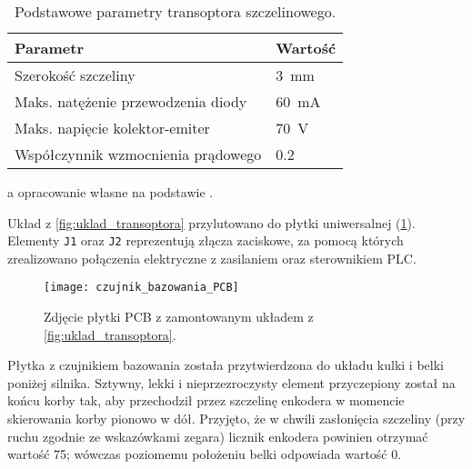 \begin{table}[h]
    \centering
    \begin{threeparttable}
        \caption{Podstawowe parametry transoptora szczelinowego.}
        \label{tab:parametry_transoptora}
        
        \begin{tabularx}{0.6\textwidth}{l | l}
            \toprule
            Parametr & Wartość \\
            \midrule
            Szerokość szczeliny & \SI{3}{\milli\meter} \\
            Maks. natężenie przewodzenia diody & \SI{60}{\milli\ampere} \\
            Maks. napięcie kolektor-emiter & \SI{70}{\volt} \\
            Współczynnik wzmocnienia prądowego & \num{0,2} \\
            \bottomrule
        \end{tabularx}
        
        \begin{tablenotes}
            \footnotesize
            \item[a] opracowanie własne na podstawie \cite{TRANSOPTOR_MANUAL}.
        \end{tablenotes}
    \end{threeparttable}
\end{table}

Układ z \cref{fig:uklad_transoptora} przylutowano do płytki uniwersalnej (\cref{fig:czujnik_bazowania_PCB}). Elementy \texttt{J1} oraz \texttt{J2} reprezentują złącza zaciskowe, za pomocą których zrealizowano połączenia elektryczne z zasilaniem oraz sterownikiem PLC.

\begin{figure}[h]
    \centering
    \texttt{[image: czujnik\_bazowania\_PCB]}
    \caption{Zdjęcie płytki PCB z zamontowanym układem z \cref{fig:uklad_transoptora}.}
    \label{fig:czujnik_bazowania_PCB}
\end{figure}

Płytka z czujnikiem bazowania została przytwierdzona do układu kulki i belki poniżej silnika. Sztywny, lekki i nieprzezroczysty element przyczepiony został na końcu korby tak, aby przechodził przez szczelinę enkodera w momencie skierowania korby pionowo w dół. Przyjęto, że w chwili zasłonięcia szczeliny (przy ruchu zgodnie ze wskazówkami zegara) licznik enkodera powinien otrzymać wartość \num{75}; wówczas poziomemu położeniu belki odpowiada wartość \num{0}.

